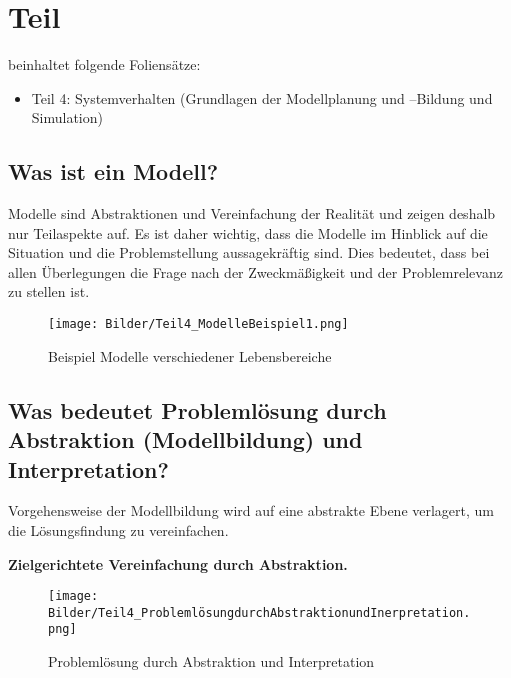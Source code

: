 \section{Teil}
beinhaltet folgende Foliensätze:

\begin{itemize}
    \item Teil 4:  Systemverhalten (Grundlagen der Modellplanung und –Bildung und Simulation)

\end{itemize}

\subsection{Was ist ein Modell?}
Modelle sind Abstraktionen und Vereinfachung der Realität und zeigen deshalb nur Teilaspekte auf.
Es ist daher wichtig, dass die Modelle im Hinblick auf die Situation und die Problemstellung aussagekräftig sind.
Dies bedeutet, dass bei allen Überlegungen die Frage nach der Zweckmäßigkeit und der Problemrelevanz zu stellen ist.
\begin{figure}[H]
    \centering
    \texttt{[image: Bilder/Teil4\_ModelleBeispiel1.png]}
    \caption{Beispiel Modelle verschiedener Lebensbereiche}
\end{figure}
\subsection{Was bedeutet Problemlösung durch Abstraktion (Modellbildung) und Interpretation?}
Vorgehensweise der Modellbildung wird auf eine abstrakte Ebene verlagert, um die Lösungsfindung zu vereinfachen. 

\textbf{Zielgerichtete Vereinfachung durch Abstraktion.}

\begin{figure}[H]
    \centering
    \texttt{[image: Bilder/Teil4\_ProblemlösungdurchAbstraktionundInerpretation.png]}
    \caption{Problemlösung durch Abstraktion und Interpretation}
\end{figure}

\newpage
